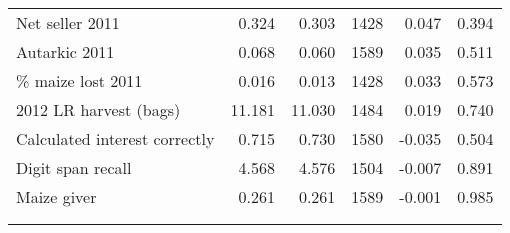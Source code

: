 \begin{tabular}{lrrrrr}
Net seller 2011 & 0.324 & 0.303 & 1428 & 0.047 & 0.394 \\
Autarkic 2011 & 0.068 & 0.060 & 1589 & 0.035 & 0.511 \\
\% maize lost 2011 & 0.016 & 0.013 & 1428 & 0.033 & 0.573 \\
2012 LR harvest (bags) & 11.181 & 11.030 & 1484 & 0.019 & 0.740 \\
Calculated interest correctly & 0.715 & 0.730 & 1580 & -0.035 & 0.504 \\
Digit span recall & 4.568 & 4.576 & 1504 & -0.007 & 0.891 \\
Maize giver & 0.261 & 0.261 & 1589 & -0.001 & 0.985 \\
\\[-1.8ex]\hline 
 \hline \\[-1.8ex]
\end{tabular}
